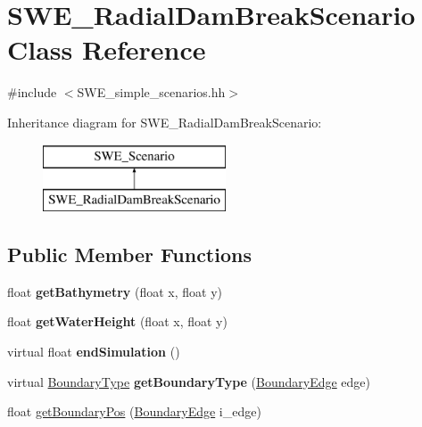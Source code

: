\hypertarget{classSWE__RadialDamBreakScenario}{\section{S\-W\-E\-\_\-\-Radial\-Dam\-Break\-Scenario Class Reference}
\label{classSWE__RadialDamBreakScenario}
}


{\ttfamily \#include $<$S\-W\-E\-\_\-simple\-\_\-scenarios.\-hh$>$}

Inheritance diagram for S\-W\-E\-\_\-\-Radial\-Dam\-Break\-Scenario\-:\begin{figure}[H]
\begin{center}
\leavevmode
\includegraphics[height=2.000000cm]{classSWE__RadialDamBreakScenario}
\end{center}
\end{figure}
\subsection*{Public Member Functions}
\begin{DoxyCompactItemize}
\item 
\hypertarget{classSWE__RadialDamBreakScenario_ab54c88d18ff3a577a3e33f1659d97b50}{float {\bfseries get\-Bathymetry} (float x, float y)}\label{classSWE__RadialDamBreakScenario_ab54c88d18ff3a577a3e33f1659d97b50}

\item 
\hypertarget{classSWE__RadialDamBreakScenario_a0fb0917dd1e47f9580bd94ba5816795c}{float {\bfseries get\-Water\-Height} (float x, float y)}\label{classSWE__RadialDamBreakScenario_a0fb0917dd1e47f9580bd94ba5816795c}

\item 
\hypertarget{classSWE__RadialDamBreakScenario_a5e118a3d34aace3175745965d5d9c567}{virtual float {\bfseries end\-Simulation} ()}\label{classSWE__RadialDamBreakScenario_a5e118a3d34aace3175745965d5d9c567}

\item 
\hypertarget{classSWE__RadialDamBreakScenario_a40a7ddfd7d85631eeb708232c9f7f20d}{virtual \hyperlink{SWE__Scenario_8hh_af75d5dd7322fa39ed0af4e7839e600f8}{Boundary\-Type} {\bfseries get\-Boundary\-Type} (\hyperlink{SWE__Scenario_8hh_aa5e01e3f7df312f7b9b0d02521141fcc}{Boundary\-Edge} edge)}\label{classSWE__RadialDamBreakScenario_a40a7ddfd7d85631eeb708232c9f7f20d}

\item 
float \hyperlink{classSWE__RadialDamBreakScenario_ac5392df630c8164560df5cb902df385a}{get\-Boundary\-Pos} (\hyperlink{SWE__Scenario_8hh_aa5e01e3f7df312f7b9b0d02521141fcc}{Boundary\-Edge} i\-\_\-edge)
\end{DoxyCompactItemize}
